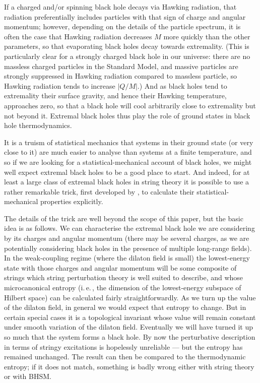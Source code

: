 \documentclass[12pt]{article}
\newcommand{\iec}{\mbox{i.\,e.\,}}
\begin{document}
 If a charged and/or spinning black hole decays via Hawking radiation, that radiation preferentially includes particles with that sign of charge and angular momentum; however, depending on the details of the particle spectrum, it is often the case that Hawking radiation decreases $M$ more quickly than the other parameters, so that evaporating black holes decay towards extremality. (This is particularly clear for a strongly charged black hole in our universe: there are no massless charged particles in the Standard Model, and massive particles are strongly suppressed in Hawking radiation compared to massless particle, so Hawking radiation tends to increase $|Q/M|$.) And as black holes tend to extremality their surface gravity, and hence their Hawking temperature, approaches zero, so that a black hole will cool arbitrarily close to extremality but not beyond it. Extremal black holes thus play the role of ground states in black hole thermodynamics.
 
 It is a truism of statistical mechanics that systems in their ground state (or very close to it) are much easier to analyse than systems at a finite temperature, and so if we are looking for a statistical-mechanical account of black holes, we might well expect extremal black holes to be a good place to start. And indeed, for at least a large class of extremal black holes in string theory  it is possible to use a rather remarkable trick, first developed by , to calculate their statistical-mechanical properties explicitly.

The details of the trick are well beyond the scope of this paper, but the basic idea is as follows. We can characterise the extremal black hole we are considering by its charges and angular momentum (there may be several charges, as we are potentially considering black holes in the presence of multiple long-range fields). In the weak-coupling regime (where the dilaton field is small) the lowest-energy state with those charges and angular momentum will be some composite of strings which string perturbation theory is well suited to describe, and whose microcanonical entropy (\iec, the dimension of the lowest-energy subspace of Hilbert space) can be calculated fairly straightforwardly. As we turn up the value of the dilaton field, in general we would expect that entropy to change. But in certain special cases it is a topological invariant whose value will remain constant under smooth variation of the dilaton field. Eventually we will have turned it up so much that the system forms a black hole. By now the perturbative description in terms of stringy excitations is hopelessly unreliable --- but the entropy has remained unchanged. The result can then be compared to the thermodynamic entropy; if it does not match, something is badly wrong either with string theory or with BHSM. 
\end{document}
